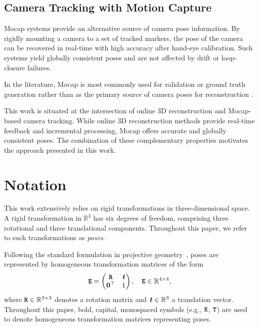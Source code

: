 \documentclass[a4paper,fleqn]{cas-dc}
\newcommand{\Vector}[1]{{\ensuremath{\textbf{\textit{#1}}}}}
\newcommand{\Matrix}[1]{{\ensuremath{\textbf{\texttt{#1}}}}}
\newcommand{\trans}{\ensuremath{^\top}}
\begin{document}
\subsection{Camera Tracking with Motion Capture}\label{ssec:related_work:camera_tracking}
Mocap systems provide an alternative source of camera pose information. By rigidly mounting a camera to a set of tracked markers, the pose of the camera can be recovered in real-time with high accuracy after hand-eye calibration. Such systems yield globally consistent poses and are not affected by drift or loop-closure failures.

In the literature, Mocap is most commonly used for validation or ground truth generation rather than as the primary source of camera poses for reconstruction \cite{endres_evaluation_2012, sturm_benchmark_2012, shu_mocap2gt_2026}. 

This work is situated at the intersection of online 3D reconstruction and Mocap-based camera tracking. While online 3D reconstruction methods provide real-time feedback and incremental processing, Mocap offers accurate and globally consistent poses. The combination of these complementary properties motivates the approach presented in this work.

\section{Notation}\label{sec:notation}
This work extensively relies on rigid transformations in three-dimensional space. A rigid transformation in $\mathbb{R}^3$ has six degrees of freedom, comprising three rotational and three translational components. Throughout this paper, we refer to such transformations as \emph{poses}.

Following the standard formulation in projective geometry~\cite{hartley_multiple_2004}, poses are represented by homogeneous transformation matrices of the form
\begin{equation}
    \Matrix{E} =
    \begin{pmatrix}
        \Matrix{R} & \Vector{t} \\
        \mathbf{0}\trans & 1
    \end{pmatrix},
    \quad \Matrix{E} \in \mathbb{R}^{4 \times 4},
\end{equation}
where $\Matrix{R} \in \mathbb{R}^{3 \times 3}$ denotes a rotation matrix and $\Vector{t} \in \mathbb{R}^3$ a translation vector. Throughout this paper, bold, capital, monospaced symbols (e.g., $\Matrix{E}$, $\Matrix{T}$) are used to denote homogeneous transformation matrices representing poses.
\end{document}
